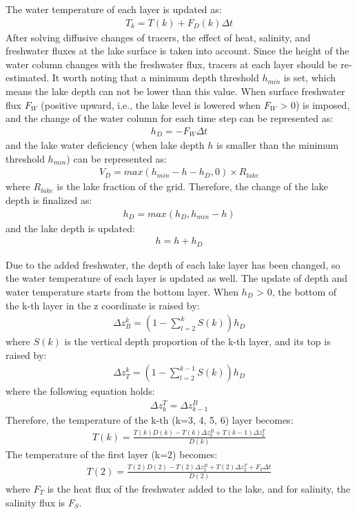 The water temperature of each layer is updated as: \begin{eqnarray}
T_{k}=T(k)+F_{D}(k)\Delta t
\end{eqnarray} After solving diffusive changes of tracers, the effect of heat, salinity, and freshwater fluxes at the lake surface is taken into account. Since the height of the water column changes with the
freshwater flux, tracers at each layer should be re-estimated. It worth noting that a minimum depth threshold \(h_{min}\) is set, which means the lake depth can not be lower than this value. When
surface freshwater flux \(F_{W}\) (positive upward, i.e., the lake level is lowered when \(F_{W}\) \textgreater{} 0) is imposed, and the change of the water column for each time step can be
represented as: \begin{eqnarray}
h_{D}=-F_{W}\Delta t
\end{eqnarray} and the lake water deficiency (when lake depth \(h\) is smaller than the minimum threshold \(h_{min}\)) can be represented as: \begin{eqnarray}
V_{D}=max(h_{min}-h-h_{D}, 0)\times R_{lake}
\end{eqnarray} where \(R_{lake}\) is the lake fraction of the grid. Therefore, the change of the lake depth is finalized as: \begin{eqnarray}
h_{D}=max(h_{D}, h_{min}-h)
\end{eqnarray} and the lake depth is updated: \begin{eqnarray}
h=h+h_{D}
\end{eqnarray}

Due to the added freshwater, the depth of each lake layer has been changed, so the water temperature of each layer is updated as well. The update of depth and water temperature starts from the bottom
layer. When \(h_{D}\) \textgreater{} 0, the bottom of the k-th layer in the z coordinate is raised by: \begin{eqnarray}
\Delta z_{B}^{k}=(1-\sum_{l=2}^{k}S(k))h_{D}
\end{eqnarray} where \(S(k)\) is the vertical depth proportion of the k-th layer, and its top is raised by: \begin{eqnarray}
\Delta z_{T}^{k}=(1-\sum_{l=2}^{k-1}S(k))h_{D}
\end{eqnarray} where the following equation holds: \begin{eqnarray}
\Delta z_{k}^{T}=\Delta z_{k-1}^{B}
\end{eqnarray} Therefore, the temperature of the k-th (k=3, 4, 5, 6) layer becomes: \begin{eqnarray}
T(k)=\frac{T(k)D(k)-T(k)\Delta z_{k}^{B}+T(k-1)\Delta z_{k}^{T}}{D(k)}
\end{eqnarray} The temperature of the first layer (k=2) becomes: \begin{eqnarray}
T(2)=\frac{T(2)D(2)-T(2)\Delta z_{2}^{B}+T(2)\Delta z_{2}^{T}+F_{T}\Delta t}{D(2)}
\end{eqnarray} where \(F_{T}\) is the heat flux of the freshwater added to the lake, and for salinity, the salinity flux is \(F_{S}\).

